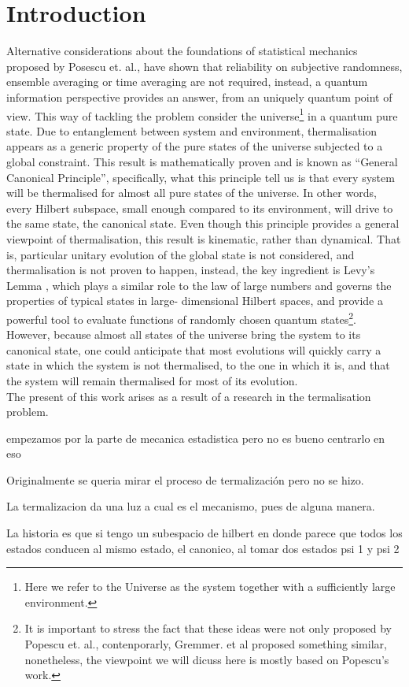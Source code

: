 \chapter*{Introduction}

Alternative considerations about the foundations of statistical mechanics proposed by Posescu et. al.\cite{popescu_foundations_2005},  have shown that reliability on subjective randomness, ensemble averaging or time averaging are not required, instead, a quantum information perspective provides an answer, from an uniquely quantum point of view. This way of tackling the problem consider the universe\footnote{Here we refer to the Universe as the system together with a sufficiently large environment.} in a quantum pure state. Due to entanglement between system and environment, thermalisation appears as a generic property of the pure states of the universe subjected to a global constraint. This result is mathematically proven and is known as ``General Canonical Principle'', specifically, what this principle tell us is that every system will be thermalised for almost all pure states of the universe. In other words, every Hilbert subspace, small enough compared to its environment, will drive to the same state, the canonical state. Even though this principle provides a general viewpoint of thermalisation, this result is kinematic, rather than dynamical. That is, particular unitary evolution of the global state is not considered, and thermalisation is not proven to happen, instead, the key ingredient is Levy's Lemma \cite{milman_asymptotic_2009,noauthor_concentration_nodate}, which plays a similar role to the law of large numbers and governs the properties of typical states in large- dimensional Hilbert spaces\cite{popescu_foundations_2005}, and provide a powerful tool to evaluate functions of randomly chosen quantum states\footnote{It is important to stress the fact that these ideas were not only proposed by Popescu et. al., contenporarly,  Gremmer. et al\cite{gemmer_quantum_2004} proposed something similar, nonetheless, the viewpoint we will dicuss here is mostly based on Popescu's work.}. However, because almost all states of the universe bring the system to its canonical state, one could anticipate that most evolutions will quickly carry a state in which the system is not thermalised, to the one in which it is, and that the system will remain thermalised for most of its evolution.\\


\cite{horodecki_partial_2005}
The present of this work arises as a result of a research in the termalisation problem.  

empezamos por la parte de mecanica estadistica pero no es bueno centrarlo en eso

Originalmente se queria mirar el proceso de termalización pero no se hizo.

La termalizacion da una luz a cual es el mecanismo, pues de alguna manera.


La historia es que si tengo un subespacio de hilbert en donde parece que todos los estados conducen al mismo estado, el canonico, al tomar dos estados psi 1 y psi 2


